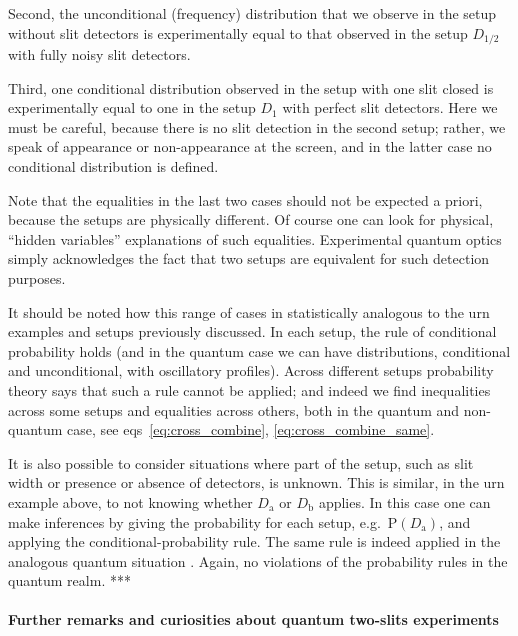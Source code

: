 \documentclass[\ifafour a4paper,12pt,\else a5paper,10pt,\fi%
onecolumn,oneside,article,%
british%
]{memoir}
\theoremstyle{remark}
\theoremstyle{innote}
\newcommand*{\citep}{\parencites}%
\newcommand*{\p}{\mathrm{P}}%
\renewcommand*{\|}[1][]{\nonscript\,#1\vert\nonscript\;\mathopen{}}
\newcommand*{\eqns}{eqs}%
\newcommand*{\eg}{{e.g.}}
\newcommand*{\yDa}{D_{\textrm{a}}}
\newcommand*{\yDb}{D_{\textrm{b}}}
\begin{document}
Second, the unconditional (frequency) distribution that we observe in the
setup without slit detectors is experimentally equal to that observed in
the setup $D_{1/2}$ with fully noisy slit detectors.

Third, one conditional distribution observed in the setup with one slit
closed is experimentally equal to one in the setup $D_{1}$ with perfect
slit detectors. Here we must be careful, because there is no slit detection
in the second setup; rather, we speak of appearance or non-appearance at
the screen, and in the latter case no conditional distribution is defined.

Note that the equalities in the last two cases should not be expected a
priori, because the setups are physically different. Of course one can look
for physical, \enquote{hidden variables} explanations of such equalities.
Experimental quantum optics simply acknowledges the fact that two setups
are equivalent for such detection purposes.

\medskip

It should be noted how this range of cases in statistically analogous to
the urn examples and setups previously discussed. In each setup, the rule
of conditional probability holds (and in the quantum case we can have
distributions, conditional and unconditional, with oscillatory profiles).
Across different setups probability theory says that such a rule cannot be
applied; and indeed we find inequalities across some setups and equalities
across others, both in the quantum and non-quantum case, see
\eqns~\eqref{eq:cross_combine}, \eqref{eq:cross_combine_same}.



  It is also possible to consider situations where part of the setup, such
  as slit width or presence or absence of detectors, is unknown. This is
  similar, in the urn example above, to not knowing whether $\yDa$ or
  $\yDb$ applies. In this case one can make inferences by giving the
  probability for each setup, \eg\ $\p(\yDa)$, and applying the
  conditional-probability rule. The same rule is indeed applied in the
  analogous quantum situation \citep[\eg][]{zimanetal2004_r2006}.
  Again, no violations of the probability rules in the quantum realm.
***


\bigskip

\paragraph{Further remarks and curiosities about quantum two-slits
  experiments}
\end{document}

